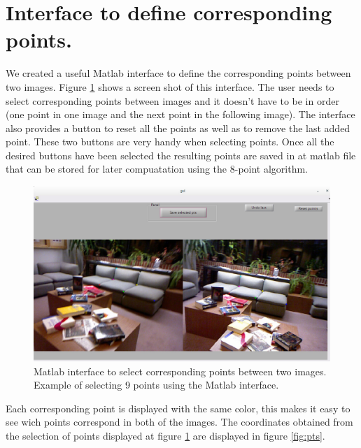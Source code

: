 \documentclass[a4paper,12pt]{article}
\begin{document}
    \section{Interface to define corresponding points.}
    We created a useful Matlab interface to define the corresponding points between two images.
    Figure \ref{fig:demo} shows a screen shot of this interface. The user needs to select
    corresponding points between images and it doesn't have to be in order (one point in one
    image and the next point in the following image). The interface also provides a button to
    reset all the points as well as to remove the last added point. These two buttons are
    very handy when selecting points. Once all the desired buttons have been selected the 
    resulting points are saved in at matlab file that can be stored for later compuatation
    using the 8-point algorithm. 

    \begin{figure}[h]
        \centering
        \includegraphics[totalheight=.38\textheight]{./images/Example.jpg}
        \caption{Matlab interface to select corresponding points between two images.
        Example of selecting 9 points using the Matlab interface.}
        \label{fig:demo}
    \end{figure}

    Each corresponding point is displayed with the same color, 
    this makes it easy to see wich points correspond in both of the images.
    The coordinates obtained from the selection of points displayed at figure \ref{fig:demo} 
    are displayed in figure \ref{fig:pts}.
\end{document}
